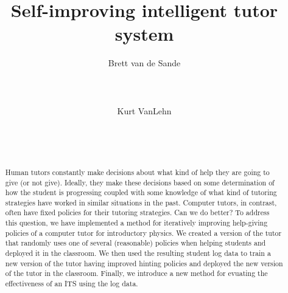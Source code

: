 \documentclass{edm_template}
\begin{document}
\title{Self-improving intelligent tutor system}
\author{
\alignauthor
      Brett van de Sande\\
       \\
       \\
       \\
\alignauthor
      Kurt VanLehn\\
       \\
       \\
       \\
}
\maketitle

%



\begin{abstract}
Human tutors constantly make decisions about
what kind of help they are going to give (or not give).  Ideally,
they make these decisions based on some determination of how
the student is progressing coupled with some knowledge of what kind
of tutoring strategies have worked in similar situations in the past.
Computer tutors, in contrast, often have fixed policies for their
tutoring strategies.   Can we do better?  To address this question, 
we have implemented a method for iteratively improving 
help-giving policies of a computer tutor for introductory physics.  
We created a version of the tutor that randomly uses one of several 
(reasonable) policies when helping students and deployed it in the
classroom.  We then used the resulting student log data to 
train a new version of the tutor having improved hinting policies
and deployed the new version of the tutor in the classroom.  
Finally, we introduce a new method for evuating the effectiveness 
of an ITS using the log data.
\end{abstract}

\end{document}
